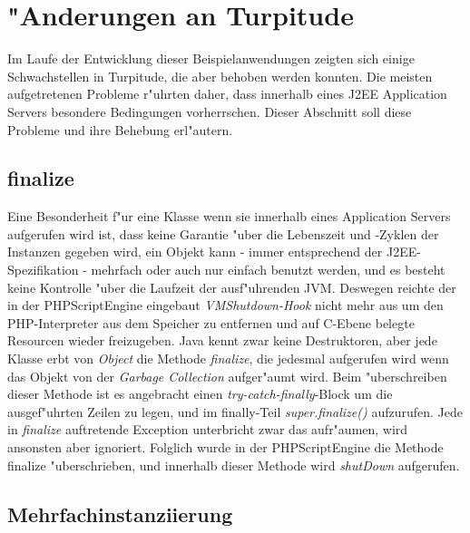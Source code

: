 \section{"Anderungen an Turpitude}
\label{sec:chap2:turp}

Im Laufe der Entwicklung dieser Beispielanwendungen zeigten sich einige Schwachstellen in
Turpitude, die aber behoben werden konnten. Die meisten aufgetretenen Probleme r"uhrten daher,
dass innerhalb eines J2EE Application Servers besondere Bedingungen vorherrschen.
Dieser Abschnitt soll diese Probleme und ihre Behebung erl"autern.

\subsection{finalize}
\label{sec:chap2:turp:final}

Eine Besonderheit f"ur eine Klasse wenn sie innerhalb eines Application Servers aufgerufen wird
ist, dass keine Garantie "uber die Lebenszeit und -Zyklen der Instanzen gegeben wird, ein Objekt kann
- immer entsprechend der J2EE-Spezifikation - mehrfach oder auch nur einfach benutzt werden, und
es besteht keine Kontrolle "uber die Laufzeit der ausf"uhrenden JVM.
Deswegen reichte der in der PHPScriptEngine eingebaut \emph{VMShutdown-Hook} nicht mehr aus um
den PHP-Interpreter aus dem Speicher zu entfernen und auf C-Ebene belegte Resourcen wieder
freizugeben. Java kennt zwar keine Destruktoren, aber jede Klasse erbt von \emph{Object} die
Methode \emph{finalize}, die jedesmal aufgerufen wird wenn das Objekt von der \emph{Garbage Collection}
aufger"aumt wird. 
Beim "uberschreiben dieser Methode ist es angebracht einen \emph{try-catch-finally}-Block
um die ausgef"uhrten Zeilen zu legen, und im finally-Teil \emph{super.finalize()} aufzurufen.
Jede in \emph{finalize} auftretende Exception unterbricht zwar das aufr"aumen, wird ansonsten
aber ignoriert.
Folglich wurde in der PHPScriptEngine die Methode finalize "uberschrieben, und innerhalb dieser
Methode wird \emph{shutDown} aufgerufen.

\subsection{Mehrfachinstanziierung}
\label{sec:chap2:turp:multi}

